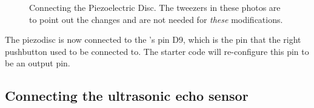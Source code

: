 \begin{figure}
    \centering
    \hfil
    \hfil
    \caption{Connecting the Piezoelectric Disc.
        The tweezers in these photos are to point out the changes and are not needed for \textit{these} modifications.}
\end{figure}

The piezodisc is now connected to the \developmentboard's pin D9, which is the pin that the right pushbutton used to be connected to.
The starter code will re-configure this pin to be an output pin.

\subsection{Connecting the ultrasonic echo sensor}

